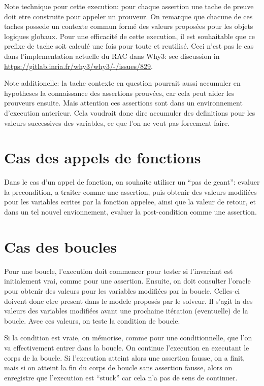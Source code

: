 \documentclass[a4paper,twoside]{article}
\begin{document}
Note technique pour cette execution: pour chaque assertion une tache de preuve
doit etre construite pour appeler un prouveur. On remarque que chacune de ces
taches possede un contexte commun formé des valeurs proposées pour les objets
logiques globaux. Pour une efficacité de cette execution, il est souhaitable que
ce prefixe de tache soit calculé une fois pour toute et reutilisé. Ceci n'est
pas le cas dans l'implementation actuelle du RAC dans Why3: see discussion in
\url{https://gitlab.inria.fr/why3/why3/-/issues/829}.

Note additionelle: la tache contexte en question pourrait aussi accumuler en
hypotheses la connaissance des assertions prouvées, car cela peut aider les
prouveurs ensuite. Mais attention ces assertions sont dans un environnement
d'execution anterieur. Cela voudrait donc dire accumuler des definitions pour
les valeurs successives des variables, ce que l'on ne veut pas forcement faire.


\section{Cas des appels de fonctions}


Dans le cas d'un appel de fonction, on souhaite utiliser un ``pas de geant'':
evaluer la precondition, a traiter comme une assertion, puis obtenir des valeurs
modifiées pour les variables ecrites par la fonction appelee, ainsi que la
valeur de retour, et dans un tel nouvel envionnement, evaluer la post-condition
comme une assertion.

\section{Cas des boucles}

Pour une boucle, l'execution doit commencer pour tester si l'invariant est
initialement vrai, comme pour une assertion. Ensuite, on doit consulter l'oracle
pour obtenir des valeurs pour les variables modifiées par la boucle. Celles-ci
doivent donc etre present dans le modele proposés par le solveur. Il s'agit la
des valeurs des variables modifiées avant une prochaine itération (eventuelle) de
la boucle. Avec ces valeurs, on teste la condition de boucle.

Si la condition est vraie, on mémorise, comme pour une conditionnelle, que l'on
va effectivement entrer dans la boucle. On continue l'execution en executant le
corps de la boucle. Si l'execution atteint alors une assertion fausse, on a
finit, mais si on atteint la fin du corps de boucle sans assertion fausse, alors
on enregistre que l'execution est ``stuck'' car cela n'a pas de sens de
continuer.
\end{document}
